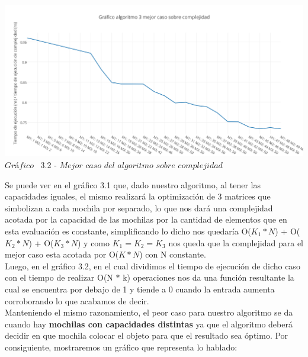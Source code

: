 \vspace*{0.3cm} \vspace*{0.3cm}
  \begin{center}
 \includegraphics[scale=0.65]{./EJ3/mejorcaso1.png}
 {$Gr$\'a$fico$ \ 3.2 - $Mejor$ $caso$ $del$ $algoritmo$ $sobre$ $complejidad$}
  \end{center}
  \vspace*{0.3cm}
  
Se puede ver en el gr\'afico 3.1 que, dado nuestro algoritmo, al tener las capacidades iguales, el mismo realizar\'a la optimizaci\'on de 3 matrices que simbolizan a cada mochila por separado, lo que nos dar\'a una complejidad acotada por la capacidad de las mochilas por la cantidad de elementos que en esta evaluaci\'on es constante, simplificando lo dicho nos quedar\'ia O($K_{1}\ast N$) + O($K_{2}\ast N$) + O($K_{3}\ast N$) y como $K_{1} = K_{2} = K_{3}$ nos queda que la complejidad para el mejor caso esta acotada por O($K \ast N$) con N constante.\\
Luego, en el gr\'afico 3.2, en el cual dividimos el tiempo de ejecuci\'on de dicho caso con el tiempo de realizar O(N $\ast$ k) operaciones nos da una funci\'on resultante la cual se encuentra por debajo de 1 y tiende a 0 cuando la entrada aumenta corroborando lo que acabamos de decir.\\

Manteniendo el mismo razonamiento, el peor caso para nuestro algoritmo se da cuando hay \textbf{mochilas con capacidades distintas} ya que el algoritmo deber\'a decidir en que mochila colocar el objeto para que el resultado sea \'optimo. Por consiguiente, mostraremos un gr\'afico que representa lo hablado:\\

